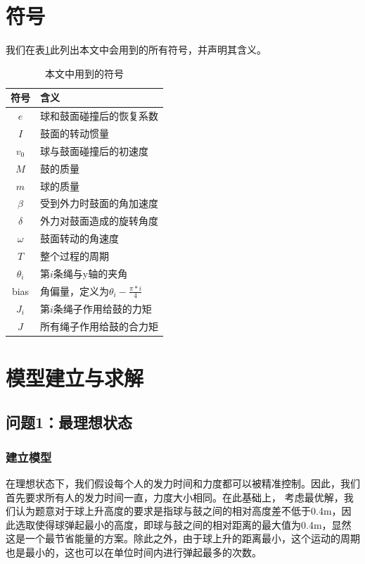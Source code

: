 \documentclass[nocover]{cumcmart}%
\begin{document}
\section{符号}
我们在表\ref{table:symbol}此列出本文中会用到的所有符号，并声明其含义。
\begin{table} [!h]
\begin{center}
\vspace{-0.1in}
\caption{本文中用到的符号}
\label{table:symbol}
\begin{tabular}{|c|l|}
\hline
\textbf{符号}&\textbf{含义}\\
\hline
$e$&球和鼓面碰撞后的恢复系数\\
\hline
$I$&鼓面的转动惯量\\
\hline
$v_0$&球与鼓面碰撞后的初速度\\
\hline
$M$&鼓的质量\\
\hline
$m$&球的质量\\
\hline
$\beta$&受到外力时鼓面的角加速度\\
\hline
$\delta$&外力对鼓面造成的旋转角度\\
\hline
$\omega$&鼓面转动的角速度\\
\hline
$T$ &整个过程的周期\\
\hline
$\theta_i$ &第$i$条绳与y轴的夹角\\
\hline
bias &角偏量，定义为$\theta_i - \frac{\pi*i}{4}$\\
\hline
$J_i$ &第$i$条绳子作用给鼓的力矩\\
\hline
$J$ &所有绳子作用给鼓的合力矩\\
\hline
\end{tabular}
\vspace{-0.2in}
\end{center}
\end{table}


\section{模型建立与求解}
\subsection{问题1：最理想状态}
\subsubsection{建立模型}
在理想状态下，我们假设每个人的发力时间和力度都可以被精准控制。因此，我们首先要求所有人的发力时间一直，力度大小相同。在此基础上，
考虑最优解，我们认为题意对于球上升高度的要求是指球与鼓之间的相对高度差不低于0.4m，因此选取使得球弹起最小的高度，即球与鼓之间的相对距离的最大值为0.4m，显然这是一个最节省能量的方案。除此之外，由于球上升的距离最小，这个运动的周期也是最小的，这也可以在单位时间内进行弹起最多的次数。
\end{document}
